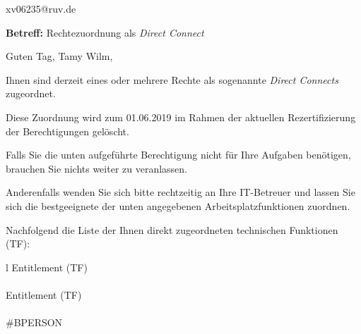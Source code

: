 \documentclass[a4paper,landscape,12pt]{letter}
\begin{document}
\begin{letter}{xv06235@ruv.de\hfill \break}
\begin{normalsize}
	\opening{\textbf{Betreff:} Rechtezuordnung als \emph{Direct Connect}}
	\begin{normalsize} \hfill
	\end{normalsize}

	\begin{normalsize}
		Guten Tag, 
	Tamy Wilm, \hfill \break
	\end{normalsize}
	\end{normalsize}
	
\begin{normalsize}
	Ihnen sind derzeit eines oder mehrere Rechte als sogenannte \emph{Direct Connects} zugeordnet.
	
	Diese Zuordnung wird zum 01.06.2019 im Rahmen der aktuellen Rezertifizierung der Berechtigungen gelöscht.
	
	Falls Sie die unten aufgeführte Berechtigung nicht für Ihre Aufgaben benötigen, 
	brauchen Sie nichts weiter zu veranlassen.
	
	Anderenfalls wenden Sie sich bitte rechtzeitig an Ihre IT-Betreuer 
	und lassen Sie sich die bestgeeignete der unten angegebenen Arbeitsplatzfunktionen zuordnen.
	\end{normalsize}
	
\begin{normalsize}
	Nachfolgend die Liste der Ihnen direkt zugeordneten technischen Funktionen (TF):

	\begin{longtable}{l}
		Entitlement (TF) \\ \hline
		\endfirsthead
		\\\hline
		Entitlement (TF) \\ \hline
		\endhead %
		\multicolumn{1}{r@{}}{Fortsetzung \ldots}\\
		\endfoot
		\hline
		\endlastfoot
	\#BPERSON\\
	\end{longtable}
	\end{normalsize}
	

\end{letter}
\end{document}
